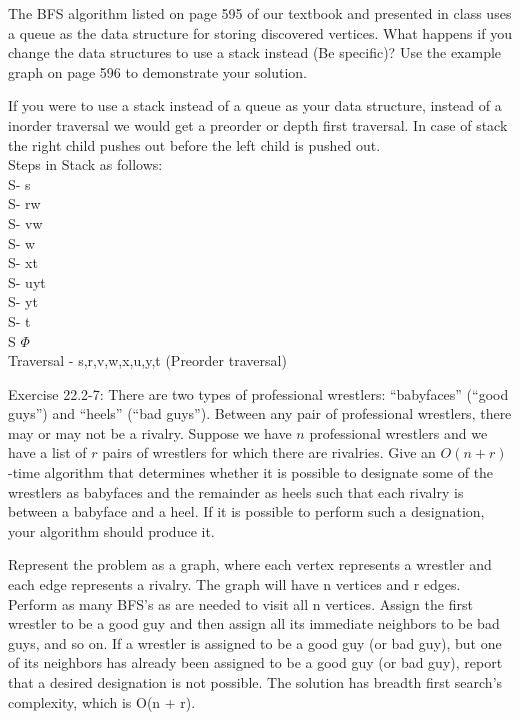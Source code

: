 \documentclass[addpoints,11pt]{exam}
\begin{document}
\begin{questions}
\question[5]
The BFS algorithm listed on page 595 of our textbook and presented in class uses a queue as the data structure for storing discovered vertices.  What happens if you change the data structures to use a stack instead (Be specific)?  Use the example graph on page 596 to demonstrate your solution.   
\begin{solutionorbox}
	If you were to use a stack instead of a queue as your data structure, instead of a inorder traversal we would get a preorder or depth first traversal. In case of stack the right child pushes out before the left child is pushed out. \\
Steps in Stack as follows:\\
S- s\\
S- rw\\
S- vw\\
S- w\\
S- xt\\
S- uyt\\
S- yt\\
S- t\\
S $\Phi$\\
Traversal - s,r,v,w,x,u,y,t (Preorder traversal)


\end{solutionorbox}
	
\ifprintanswers
\newpage
\else
\bigskip
\fi



\question[5] Exercise 22.2-7:  There are two types of professional wrestlers: ``babyfaces'' (``good guys'') and ``heels'' (``bad guys'').  Between any pair of professional wrestlers, there may or may not be a rivalry.  Suppose we have $n$ professional wrestlers and we have a list of $r$ pairs of wrestlers for which there are rivalries.  Give an $O(n+r)$-time algorithm that determines whether it is possible to designate some of the wrestlers as babyfaces and the remainder as heels such that each rivalry is between a babyface and a heel.  If it is possible to perform such a designation, your algorithm should produce it.
\begin{solutionorbox}
	Represent the problem as a graph, where each vertex represents a wrestler and each edge
	represents a rivalry. The graph will have n vertices and r edges.
	Perform as many BFS’s as are needed to visit all n vertices. Assign the first wrestler to be a good guy
	and then assign all its immediate neighbors to be bad guys, and so on. If a wrestler is assigned to be a
	good guy (or bad guy), but one of its neighbors has already been assigned to be a good guy (or bad guy),
	report that a desired designation is not possible. The solution has breadth first search's complexity, which is O(n + r).


\end{solutionorbox}
\end{questions}
\end{document}
